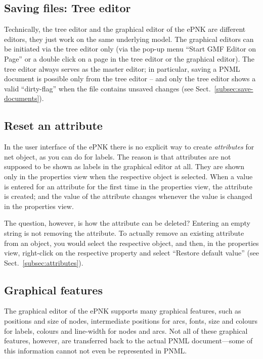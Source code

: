 \subsection{Saving files: Tree editor}
Technically, the tree editor and the graphical editor of the ePNK are
different editors, they just work on the same underlying model. The
graphical editors can be initiated via the tree editor only (via the
pop-up menu ``Start GMF Editor on Page'' or a double click on a page
in the tree editor or the graphical editor). The tree editor always
serves as the master editor; in particular, saving a PNML document
is possible only from the tree editor -- and only the tree editor
shows a valid ``dirty-flag'' when the file contains unsaved changes
(see Sect.~\ref{subsec:save-documents}).

\subsection{Reset an attribute}
\label{subsec:user:reset-attribute}

In the user interface of the ePNK there is no explicit way to create
\emph{attributes}%
for net object, as you can do for labels. The reason is that attributes are
not supposed to be shown as labels in the graphical editor at all. They
are shown only in the properties view when the respective object is
selected. When a value is entered for an attribute for the first time
in the properties view, the attribute is created; and the value of
the attribute changes whenever the value is changed in the properties view.

The question, however, is how the attribute can be deleted? Entering
an empty string is not removing the attribute. To actually remove
an existing attribute from an object, you would select the respective
object, and then, in the properties view, right-click on the respective
property and select ``Restore default value'' (see 
Sect.~\ref{subsec:attributes}). 

\subsection{Graphical features}
\label{subsec:supported-graphical-features}

The graphical editor of the ePNK supports many graphical features, such as
positions and size of nodes, intermediate positions for arcs, fonts, size and
colours for labels, colours and line-width for nodes and arcs. Not
all of these graphical features, however, are transferred back to the actual
PNML document---some of this information cannot not even be represented in PNML.

